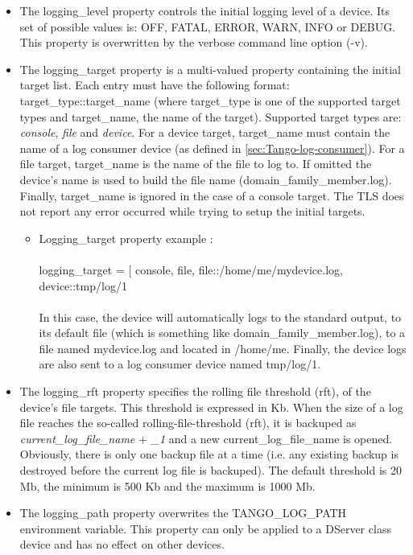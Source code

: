 \begin{itemize}
\item The logging\_level property controls the initial
logging level of a device. Its set of possible values is: \textquotedbl{}OFF\textquotedbl{},
\textquotedbl{}FATAL\textquotedbl{}, \textquotedbl{}ERROR\textquotedbl{},
\textquotedbl{}WARN\textquotedbl{}, \textquotedbl{}INFO\textquotedbl{}
or \textquotedbl{}DEBUG\textquotedbl{}. This property is overwritten
by the verbose command line option (-v).
\item The logging\_target property is a multi-valued
property containing the initial target list. Each entry must have
the following format: target\_type::target\_name (where target\_type
is one of the supported target types and target\_name, the name of
the target). Supported target types are: \emph{console}, \emph{file}
and \emph{device}. For a device target, target\_name must contain
the name of a log consumer device (as defined in \ref{sec:Tango-log-consumer}).
For a file target, target\_name is the name of the file to log to.
If omitted the device's name is used to build the file name (domain\_family\_member.log).
Finally, target\_name is ignored in the case of a console target.
The TLS does not report any error occurred while trying to setup the
initial targets. 

\begin{itemize}
\item Logging\_target property example : \\
\\
logging\_target = {[} \textquotedbl{}console\textquotedbl{}, \textquotedbl{}file\textquotedbl{},
\textquotedbl{}file::/home/me/mydevice.log\textquotedbl{}, \textquotedbl{}device::tmp/log/1\textquotedbl{}{]}\\
\\
In this case, the device will automatically logs to the standard output,
to its default file (which is something like domain\_family\_member.log),
to a file named mydevice.log and located in /home/me. Finally, the
device logs are also sent to a log consumer device named tmp/log/1. 
\end{itemize}
\item The logging\_rft property specifies the rolling
file threshold (rft), of the device's file targets. This threshold
is expressed in Kb. When the size of a log file reaches the so-called
rolling-file-threshold (rft), it is backuped as \textquotedbl{}\emph{current\_log\_file\_name}\textquotedbl{}
+ \textquotedbl{}\emph{\_1}\textquotedbl{} and a new current\_log\_file\_name
is opened. Obviously, there is only one backup file at a time (i.e.
any existing backup is destroyed before the current log file is backuped).
The default threshold is 20 Mb, the minimum is 500 Kb and the maximum
is 1000 Mb.
\item The logging\_path property overwrites the TANGO\_LOG\_PATH
environment variable. This property can only be applied to a DServer
class device and has no effect on other devices.
\end{itemize}

